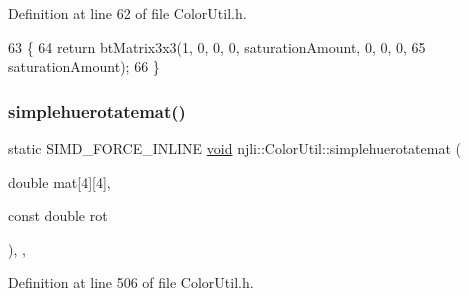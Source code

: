 Definition at line 62 of file Color\+Util.\+h.


\begin{DoxyCode}
63     \{
64       \textcolor{keywordflow}{return} btMatrix3x3(1, 0, 0, 0, saturationAmount, 0, 0, 0,
65                          saturationAmount);
66     \}
\end{DoxyCode}
\mbox{\label{classnjli_1_1_color_util_ad8878d29f6f4f7cc09cad4a0decd18cf}} 
\subsubsection{\texorpdfstring{simplehuerotatemat()}{simplehuerotatemat()}}
{\footnotesize\ttfamily static S\+I\+M\+D\+\_\+\+F\+O\+R\+C\+E\+\_\+\+I\+N\+L\+I\+NE \mbox{\hyperlink{_thread_8h_af1e856da2e658414cb2456cb6f7ebc66}{void}} njli\+::\+Color\+Util\+::simplehuerotatemat (\begin{DoxyParamCaption}\item[{double}]{mat\mbox{[}4\mbox{]}\mbox{[}4\mbox{]},  }\item[{const double}]{rot }\end{DoxyParamCaption})\hspace{0.3cm}{\ttfamily [inline]}, {\ttfamily [static]}, {\ttfamily [protected]}}



Definition at line 506 of file Color\+Util.\+h.


